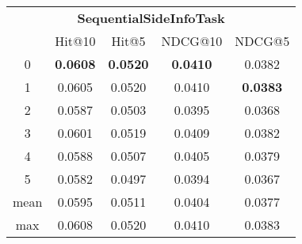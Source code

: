 \documentclass{article}
\begin{document}
 

\begin{tabular}{c|cccc}

\multicolumn{5}{c}{\textbf{SequentialSideInfoTask}} \\
\noalign{\smallskip}
\noalign{\smallskip}
\toprule
\multicolumn{1}{c}{Template ID}	&	\multicolumn{1}{|c}{Hit@10}	&	\multicolumn{1}{c}{Hit@5}	&	\multicolumn{1}{c}{NDCG@10}	&	\multicolumn{1}{c}{NDCG@5}\\
\midrule
0	&	\textbf{0.0608}	&	\textbf{0.0520}	&	\textbf{0.0410}	&	0.0382\\
1	&	0.0605	&	0.0520	&	0.0410	&	\textbf{0.0383}\\
2	&	0.0587	&	0.0503	&	0.0395	&	0.0368\\
3	&	0.0601	&	0.0519	&	0.0409	&	0.0382\\
4	&	0.0588	&	0.0507	&	0.0405	&	0.0379\\
5	&	0.0582	&	0.0497	&	0.0394	&	0.0367\\
\midrule
mean	&	0.0595	&	0.0511	&	0.0404	&	0.0377\\
max	&	0.0608	&	0.0520	&	0.0410	&	0.0383\\
\bottomrule

\end{tabular}
\end{document}
